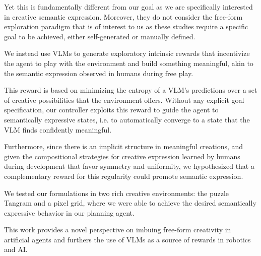 Yet this is fundamentally different from our goal as we are specifically interested in creative semantic expression.
Moreover, they do not consider the free-form exploration paradigm that is of interest to us as these studies require a specific goal to be achieved, either self-generated or manually defined.

We instead use VLMs to generate exploratory intrinsic rewards that incentivize the agent to play with the environment and build something meaningful, akin to the semantic expression observed in humans during free play.

This reward is based on minimizing the entropy of a VLM's predictions over a set of creative possibilities that the environment offers.
Without any explicit goal specification, our controller exploits this reward to guide the agent to semantically expressive states, i.e. to automatically converge to a state that the VLM finds confidently meaningful.


Furthermore, since there is an implicit structure in meaningful creations, and given the compositional strategies for creative expression learned by humans during development \citep{symmetry,compositional} that favor symmetry and uniformity, we hypothesized that a complementary reward for this regularity \citep{rair} could promote semantic expression.

We tested our formulations in two rich creative environments: the puzzle Tangram and a pixel grid, where we were able to achieve the desired semantically expressive behavior in our planning agent.

This work provides a novel perspective on imbuing free-form creativity in artificial agents and furthers the use of VLMs as a source of rewards in robotics and AI.
